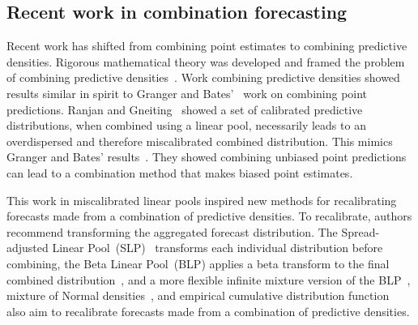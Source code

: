 \documentclass[preprint,authoryear]{elsarticle}
\begin{document}
\subsection{Recent work in combination forecasting}

Recent work has shifted from combining point estimates to combining predictive densities.
Rigorous mathematical theory was developed and framed the problem of combining predictive densities~\citep{gneiting2013combining}.
Work combining predictive densities showed results similar in spirit to Granger and Bates'~\citep{bates1969combination,granger1984improved} work on combining point predictions.
Ranjan and Gneiting~\citep{ranjan2010combining,gneiting2013combining} showed a set of calibrated predictive distributions, when combined using a linear pool, necessarily leads to an overdispersed and therefore miscalibrated combined distribution.
This mimics Granger and Bates' results~\citep{bates1969combination}. 
They showed combining unbiased point predictions can lead to a combination method that makes biased point estimates.

This work in miscalibrated linear pools inspired new methods for recalibrating forecasts made from a combination of predictive densities. To recalibrate, authors recommend transforming the aggregated forecast distribution.
The Spread-adjusted Linear Pool~(SLP)~\citep{berrocal2007combining,glahn2009mos,kleiber2011locally} transforms each individual distribution before combining, the Beta Linear Pool~(BLP) applies a beta transform to the final combined  distribution~\cite{gneiting2013combining,ranjan2010combining}, and a more flexible infinite mixture version of the BLP~\cite{bassetti2018bayesian}, mixture of Normal densities~\cite{baran2018combining}, and empirical cumulative distribution function~\cite{garratt2019empirically} also aim to recalibrate forecasts made from a combination of predictive densities.
\end{document}

